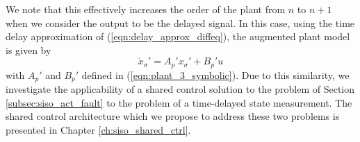 We note that this effectively increases the order of the plant from $n$ to $n+1$ when we consider the output to be the delayed signal. In this case, using the time delay approximation of (\ref{eqn:delay_approx_diffeq}), the augmented plant model is given by
\begin{equation}
	\dot{x}_\sigma' = A_p' x_\sigma' + B_p' u \label{eqn:plant_3_tau}
\end{equation}
with $A_p'$ and $B_p'$ defined in (\ref{eqn:plant_3_symbolic}). Due to this similarity, we investigate the applicability of a shared control solution to the problem of Section \ref{subsec:siso_act_fault} to the problem of a time-delayed state measurement. The shared control architecture which we propose to address these two problems is presented in Chapter \ref{ch:siso_shared_ctrl}.


